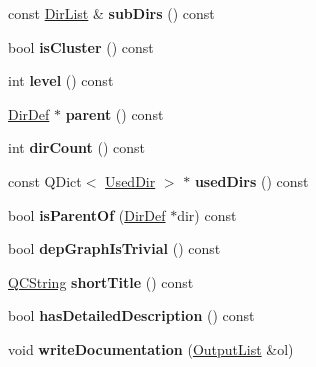 \begin{DoxyCompactItemize}
\item 
\mbox{\label{class_dir_def_a6082ee763ddb9af6522287b0656d5e2a}} 
const \mbox{\hyperlink{class_dir_list}{Dir\+List}} \& {\bfseries sub\+Dirs} () const
\item 
\mbox{\label{class_dir_def_a135b1daa688a3b9732ac27ed331cc75d}} 
bool {\bfseries is\+Cluster} () const
\item 
\mbox{\label{class_dir_def_a0680c7d7a1f951db494ee93813d50b04}} 
int {\bfseries level} () const
\item 
\mbox{\label{class_dir_def_a6f9b40c97ef0f3aadf7611c7230e4c55}} 
\mbox{\hyperlink{class_dir_def}{Dir\+Def}} $\ast$ {\bfseries parent} () const
\item 
\mbox{\label{class_dir_def_a04a8d02d367315bc0eeca248fc0ad34e}} 
int {\bfseries dir\+Count} () const
\item 
\mbox{\label{class_dir_def_a0b031023b68a649627980a280e729d1e}} 
const Q\+Dict$<$ \mbox{\hyperlink{class_used_dir}{Used\+Dir}} $>$ $\ast$ {\bfseries used\+Dirs} () const
\item 
\mbox{\label{class_dir_def_a573d58693aa977d44e4a0e9affc702e4}} 
bool {\bfseries is\+Parent\+Of} (\mbox{\hyperlink{class_dir_def}{Dir\+Def}} $\ast$dir) const
\item 
\mbox{\label{class_dir_def_add38cd6b8f41eb6cabd141ffbded42f3}} 
bool {\bfseries dep\+Graph\+Is\+Trivial} () const
\item 
\mbox{\label{class_dir_def_ab34f8586ca42beb0f241bf0c8d5de8bd}} 
\mbox{\hyperlink{class_q_c_string}{Q\+C\+String}} {\bfseries short\+Title} () const
\item 
\mbox{\label{class_dir_def_ad0830c964e4b70cf2e3f93675ba90d0d}} 
bool {\bfseries has\+Detailed\+Description} () const
\item 
\mbox{\label{class_dir_def_a000d1daece49eaabe805fb709be01c67}} 
void {\bfseries write\+Documentation} (\mbox{\hyperlink{class_output_list}{Output\+List}} \&ol)

\end{DoxyCompactItemize}
